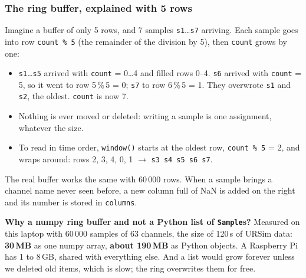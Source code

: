 \documentclass[10pt]{article}
\newcommand{\brkus}{\textunderscore\allowbreak}
\newcommand{\f}[1]{\texttt{\let\_\brkus #1}}
\begin{document}
\subsubsection*{The ring buffer, explained with 5 rows}
Imagine a buffer of only 5 rows, and 7 samples \f{s1}\ldots\f{s7} arriving. Each sample goes into
row \f{count \% 5} (the remainder of the division by 5), then \f{count} grows by one:
\begin{center}
\end{center}
\begin{itemize}
\item \f{s1}\ldots\f{s5} arrived with \f{count} = 0\ldots4 and filled rows 0--4. \f{s6} arrived
with \f{count} = 5, so it went to row 5\,\%\,5 = 0; \f{s7} to row 6\,\%\,5 = 1. They overwrote
\f{s1} and \f{s2}, the oldest. \f{count} is now 7.
\item Nothing is ever moved or deleted: writing a sample is one assignment, whatever the size.
\item To read in time order, \f{window()} starts at the oldest row, \f{count \% 5} = 2, and wraps
around: rows 2, 3, 4, 0, 1 \(\to\) \f{s3 s4 s5 s6 s7}.
\end{itemize}
The real buffer works the same with 60\,000 rows. When a sample brings a channel name never seen
before, a new column full of NaN is added on the right and its number is stored in
\f{\_columns}.

\begin{why}
\textbf{Why a numpy ring buffer and not a Python list of \f{Sample}s?} Measured on this laptop with
60\,000 samples of 63 channels, the size of 120\,s of URSim data: \textbf{30\,MB} as one numpy
array, \textbf{about 190\,MB} as Python objects. A Raspberry Pi has 1 to 8\,GB, shared with
everything else. And a list would grow forever unless we deleted old items, which is slow; the
ring overwrites them for free.
\end{why}
\end{document}
